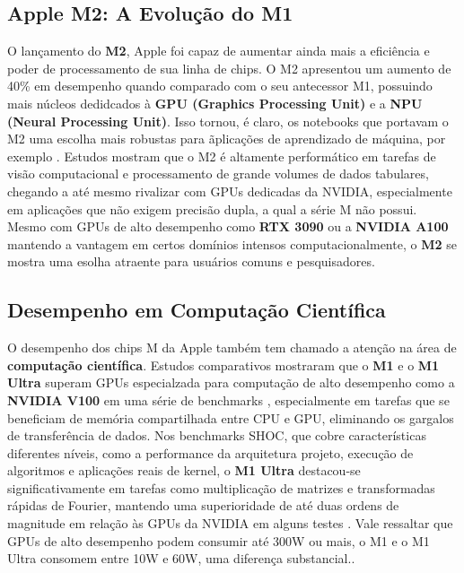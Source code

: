 \documentclass[a4paper,times,12pt]{article}
\begin{document}
\subsection{Apple M2: A Evolução do M1}
\hspace{+15pt}
O lançamento do \textbf{M2}, Apple foi capaz de aumentar ainda mais a eficiência e poder de processamento de sua linha de chips. O M2 apresentou um aumento de 40\% em desempenho quando comparado com o seu antecessor M1, possuindo mais núcleos dedidcados à \textbf{GPU (Graphics Processing Unit)} e a \textbf{NPU (Neural Processing Unit)}. Isso tornou, é claro, os notebooks que portavam o M2 uma escolha mais robustas para ãplicações de aprendizado de máquina, por exemplo \cite{usability_ml}. Estudos mostram que o M2 é altamente performático em tarefas de visão computacional e processamento de grande volumes de dados tabulares, chegando a até mesmo rivalizar com GPUs dedicadas da NVIDIA, especialmente em aplicações que não exigem precisão dupla, a qual a série M não possui. Mesmo com GPUs de alto desempenho como \textbf{RTX 3090} ou a \textbf{NVIDIA A100} mantendo a vantagem em certos domínios intensos computacionalmente, o \textbf{M2} se mostra uma esolha atraente para usuários comuns e pesquisadores.\cite{usability_ml}

\subsection{Desempenho em Computação Científica}
\hspace{+15pt}
O desempenho dos chips M da Apple também tem chamado a atenção na área de \textbf{computação científica}. Estudos comparativos mostraram que o \textbf{M1} e o \textbf{M1 Ultra} superam GPUs especialzada para computação de alto desempenho como a \textbf{NVIDIA V100} em uma série de benchmarks , especialmente em tarefas que se beneficiam de memória compartilhada entre CPU e GPU, eliminando os gargalos de transferência de dados. Nos benchmarks SHOC, que cobre características diferentes níveis, como a performance da arquitetura projeto, execução de algoritmos e aplicações reais de kernel, o \textbf{M1 Ultra} destacou-se significativamente em tarefas como multiplicação de matrizes e transformadas rápidas de Fourier, mantendo uma superioridade de até duas ordens de magnitude em relação às GPUs da NVIDIA em alguns testes \cite{apple_silicon_scientific_computing}.
Vale ressaltar que GPUs de alto desempenho podem consumir até 300W ou mais, o M1 e o M1 Ultra consomem entre 10W e 60W, uma diferença substancial.\cite{apple_silicon_scientific_computing}.
\end{document}
